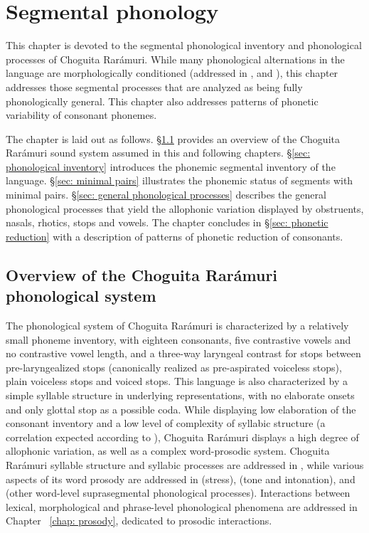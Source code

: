 \chapter{Segmental phonology}
\label{chap: phonology}

This chapter is devoted to the segmental phonological inventory and phonological processes of Choguita Rarámuri. While many phonological alternations in the language are morphologically conditioned (addressed in ,  and ), this chapter addresses those segmental processes that are analyzed as being fully phonologically general. This chapter also addresses patterns of phonetic variability of consonant phonemes.

The chapter is laid out as follows. §\ref{sec: overview sound} provides an overview of the Choguita Rarámuri sound system assumed in this and following chapters. §\ref{sec: phonological inventory} introduces the phonemic segmental inventory of the language. §\ref{sec: minimal pairs} illustrates the phonemic status of segments with minimal pairs. §\ref{sec: general phonological processes} describes the general phonological processes that yield the allophonic variation displayed by obstruents, nasals, rhotics, stops and vowels. The chapter concludes in §\ref{sec: phonetic reduction} with a description of patterns of phonetic reduction of consonants.

\section{Overview of the Choguita Rarámuri phonological system}
\label{sec: overview sound}

The phonological system of Choguita Rarámuri is characterized by a relatively small phoneme inventory, with eighteen consonants, five contrastive vowels and no contrastive vowel length, and a three-way laryngeal contrast for stops between pre-laryngealized stops (canonically realized as pre-aspirated voiceless stops), plain voiceless stops and voiced stops. This language is also characterized by a simple syllable structure in underlying representations, with no elaborate onsets and only glottal stop as a possible coda. While displaying low elaboration of the consonant inventory and a low level of complexity of syllabic structure (a correlation expected according to \citealt{maddieson2005issues}), Choguita Rarámuri displays a high degree of allophonic variation, as well as a complex word-prosodic system. Choguita Rarámuri syllable structure and syllabic processes are addressed in , while various aspects of its word prosody are addressed in  (stress),  (tone and intonation), and  (other word-level suprasegmental phonological processes). Interactions between lexical, morphological and phrase-level phonological phenomena are addressed in Chapter ~\ref{chap: prosody}, dedicated to prosodic interactions.

